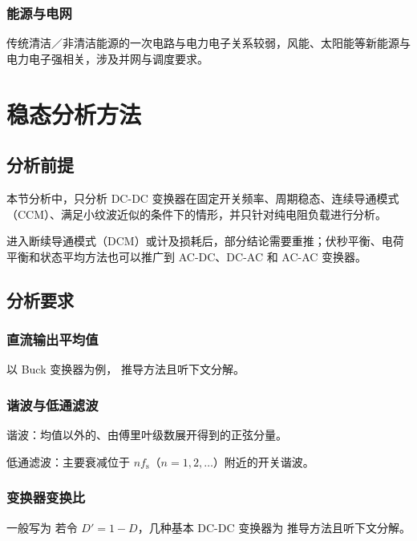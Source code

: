 \subsubsection{能源与电网}

传统清洁／非清洁能源的一次电路与电力电子关系较弱，风能、太阳能等新能源与电力电子强相关，涉及并网与调度要求。



\newpage{}

\section{稳态分析方法}

\subsection{分析前提}

本节分析中，只分析 DC-DC 变换器在固定开关频率、周期稳态、连续导通模式（CCM）、满足小纹波近似的条件下的情形，并只针对纯电阻负载进行分析。

进入断续导通模式（DCM）或计及损耗后，部分结论需要重推；伏秒平衡、电荷平衡和状态平均方法也可以推广到 AC-DC、DC-AC 和 AC-AC 变换器。

\subsection{分析要求}
\subsubsection{直流输出平均值}

以 Buck 变换器为例，
推导方法且听下文分解。

\subsubsection{谐波与低通滤波}

谐波：均值以外的、由傅里叶级数展开得到的正弦分量。

低通滤波：主要衰减位于 $nf_{\mathrm{s}}$（$n=1,2,\ldots$）附近的开关谐波。

\subsubsection{变换器变换比}

一般写为
若令 $D'=1-D$，几种基本 DC-DC 变换器为
推导方法且听下文分解。

